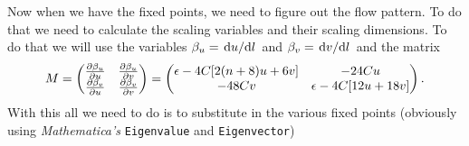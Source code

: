 \documentclass[11pt,letter, swedish, english
]{article}
\begin{document}
Now when we have the fixed points, we need to figure out the flow
pattern. To do that we need to calculate the scaling variables and
their scaling dimensions. To do that we will use the variables
$\beta_u=\dv*{u}{l}$ and $\beta_v=\dv*{v}{l}$ and the matrix
\begin{equation}
M=
\begin{pmatrix}
\pdv{\beta_u}{u} & \pdv{\beta_u}{v} \\
\pdv{\beta_v}{u} & \pdv{\beta_v}{v} 
\end{pmatrix}
=
\begin{pmatrix}
\epsilon-4C[2(n+8)u +6v] & -24Cu \\
 -48Cv & \epsilon-4C[12u +18v]
\end{pmatrix}.
\end{equation}
With this all we need to do is to substitute in the various fixed
points (obviously using \textit{Mathematica's} \texttt{Eigenvalue} and
\texttt{Eigenvector})
\end{document}

